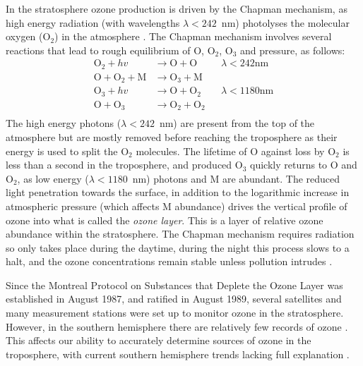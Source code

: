     In the stratosphere ozone production is driven by the Chapman mechanism, as high energy radiation (with wavelengths $\lambda<242$~nm) photolyses the molecular oxygen (O$_2$) in the atmosphere \parencite[][Chapter 3, section 2]{BrasseurJacob2017}.
    The Chapman mechanism involves several reactions that lead to rough equilibrium of O, O$_2$, O$_3$ and pressure, as follows:
    \begin{equation}
      \begin{aligned}
        \text{O}_2 + hv              & \to \text{O}+\text{O}     && \lambda < 242 \text{nm} \\
        \text{O}+\text{O}_2+\text{M} & \to \text{O}_3+\text{M}   &&    \\
        \text{O}_3 + hv              & \to \text{O}+\text{O}_2   && \lambda < 1180 \text{nm} \\
        \text{O} + \text{O}_3        & \to \text{O}_2+\text{O}_2 &&       \\
      \end{aligned}
      \label{LR:O3:eqn_Chapman}
    \end{equation}
    The high energy photons ($\lambda < 242$~nm) are present from the top of the atmosphere but are mostly removed before reaching the troposphere as their energy is used to split the O$_2$ molecules.
    The lifetime of O against loss by O$_2$ is less than a second in the troposphere, and produced O$_3$ quickly returns to O and O$_2$, as low energy ($\lambda < 1180$~nm) photons and M are abundant.
    The reduced light penetration towards the surface, in addition to the logarithmic increase in atmospheric pressure (which affects M abundance) drives the vertical profile of ozone into what is called the \textit{ozone layer}.
    This is a layer of relative ozone abundance within the stratosphere.
    The Chapman mechanism requires radiation so only takes place during the daytime, during the night this process slows to a halt, and the ozone concentrations remain stable unless pollution intrudes \parencite[Chapter 10]{Jacob_1999_book}.
  
    
    Since the Montreal Protocol on Substances that Deplete the Ozone Layer was established in August 1987, and ratified in August 1989, several satellites and many measurement stations were set up to monitor ozone in the stratosphere.
    However, in the southern hemisphere there are relatively few records of ozone \parencite{Huang2018}.
    This affects our ability to accurately determine sources of ozone in the troposphere, with current southern hemisphere trends lacking full explanation \parencite{Zeng2017}. 
  
